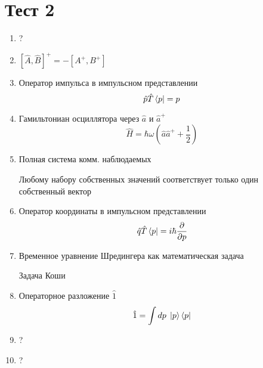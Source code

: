 \section*{Тест 2}
\begin{enumerate}
    \item ?
    \item $[\hat A,\hat B]^+=-[A^+,B^+]$
    \item Оператор импульса в импульсном представлении
        $$\hat p \hat T\bra{p}=p$$
    \item Гамильтониан осциллятора через $\hat a$ и $\hat a^+$
        $$\hat H=\hbar\omega(\hat a\hat a^++\frac{1}{2})$$
    \item Полная система комм. наблюдаемых

        Любому набору собственных значений соответствует только один 
        собственный вектор
    \item Оператор координаты в импульсном представлении
        $$\hat q\hat T\bra{p}=i\hbar\frac{\partial}{\partial p}$$
    \item Временное уравнение Шредингера как математическая задача

        Задача Коши
    \item Операторное разложение $\hat 1$
        $$\hat 1=\int dp\;\ket{p}\bra{p}$$
    \item ?
    \item ?
\end{enumerate}
